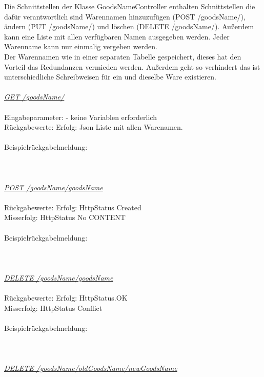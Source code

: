 Die Schnittstellen der Klasse GoodsNameController enthalten Schnittstellen die dafür verantwortlich sind Warennamen hinzuzufügen (POST /goodsName/), ändern (PUT /goodsName/) und löschen (DELETE /goodsName/). Außerdem kann eine Liste mit allen verfügbaren Namen ausgegeben werden.
Jeder Warenname kann nur einmalig vergeben werden. \\
Der Warennamen wie in einer separaten Tabelle gespeichert, dieses hat den Vorteil das Redundanzen vermieden werden. Außerdem geht so verhindert das ist unterschiedliche Schreibweisen für ein und dieselbe Ware existieren.
\\
\\
\textit{\underline{GET /goodsName/}}
\\
\\
Eingabeparameter: \tab					- keine Variablen erforderlich
\\
Rückgabewerte: \tab 					Erfolg: Json Liste mit allen Warenamen.\\
\\
Beispielrückgabelmeldung:	
\\
\\
\\
\\
\textit{\underline{POST /goodsName/{goodsName}}}
\\
\\
Rückgabewerte: \tab 					Erfolg: HttpStatus Created\\
\tab \tab 								Misserfolg: HttpStatus No CONTENT\\
\\
Beispielrückgabelmeldung:	
\\
\\
\\
\\
\textit{\underline{DELETE /goodsName/{goodsName}}}
\\
\\
Rückgabewerte: \tab 					Erfolg: HttpStatus.OK\\
\tab \tab 								Misserfolg: HttpStatus Conflict\\
\\
Beispielrückgabelmeldung:	
\\
\\
\\
\\
\textit{\underline{DELETE /goodsName/{oldGoodsName}/{newGoodsName}}}
